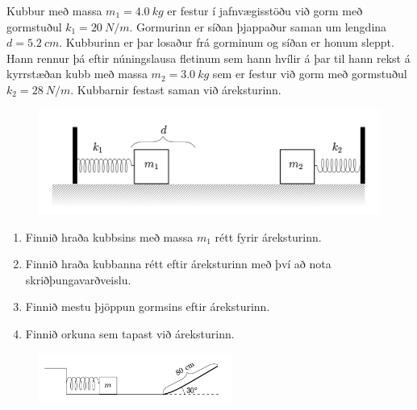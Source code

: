 \begin{enumerate}[label = \textbf{Dæmi \thechapter.\arabic*.}]
\begin{minipage}{\linewidth}
    
    \item Kubbur með massa $m_1 = \SI{4.0}{kg}$ er festur í jafnvægisstöðu við gorm með gormstuðul $k_1 = \SI{20}{N/m}$. Gormurinn er síðan þjappaður saman um lengdina $d = \SI{5.2}{cm}$. Kubburinn er þar losaður frá gorminum og síðan er honum sleppt. Hann rennur þá eftir núningslausa fletinum sem hann hvílir á þar til hann rekst á kyrrstæðan kubb með massa $m_2 = \SI{3.0}{kg}$ sem er festur við gorm með gormstuðul $k_2 = \SI{28}{N/m}$. Kubbarnir festast saman við áreksturinn.

\end{minipage}

\begin{figure}[H]
    \centering
    \includegraphics[scale = 0.35]{images/gormur.png}
\end{figure}

\begin{enumerate}[label = \textbf{(\alph*)}]
    \item Finnið hraða kubbsins með massa $m_1$ rétt fyrir áreksturinn.

    \item Finnið hraða kubbanna rétt eftir áreksturinn með því að nota skriðþungavarðveislu.
    
    \item Finnið mestu þjöppun gormsins eftir áreksturinn.
    
    \item Finnið orkuna sem tapast við áreksturinn.
\end{enumerate}

\begin{minipage}{\linewidth}
\begin{figure}
\vspace{-0.5cm}
\includegraphics[width=2.5in]{images/rampurmerking.png}
\end{figure}


\end{minipage}
\end{enumerate}
